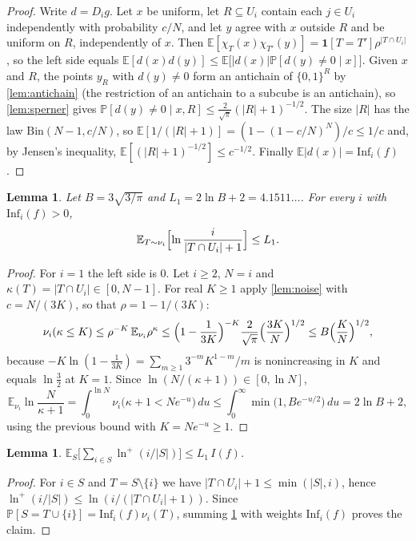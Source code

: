 \documentclass[11pt]{amsart}
\newtheorem{lemma}[theorem]{Lemma}
\theoremstyle{definition}
\theoremstyle{remark}
\newcommand{\E}{\mathbb{E}}
\renewcommand{\Pr}{\mathbb{P}}
\newcommand{\Inf}{\mathrm{Inf}}
\newcommand{\Bin}{\mathrm{Bin}}
\newcommand{\bits}{\{0,1\}}
\begin{document}
\begin{proof}
Write $d=D_ig$. Let $x$ be uniform, let $R\subseteq U_i$ contain each $j\in U_i$ independently with probability
$c/N$, and let $y$ agree with $x$ outside $R$ and be uniform on $R$, independently of $x$. Then
$\E[\chi_T(x)\chi_{T'}(y)]=\mathbf 1[T=T']\rho^{|T\cap U_i|}$, so the left side equals
$\E[d(x)d(y)]\le\E\bigl[|d(x)|\Pr[d(y)\ne0\mid x]\bigr]$. Given $x$ and $R$, the points $y_R$ with $d(y)\ne0$ form
an antichain of $\bits^R$ by \cref{lem:antichain} (the restriction of an antichain to a subcube is an antichain),
so \cref{lem:sperner} gives $\Pr[d(y)\ne0\mid x,R]\le\frac2{\sqrt\pi}(|R|+1)^{-1/2}$. The size $|R|$ has the law
$\Bin(N-1,c/N)$, so $\E[1/(|R|+1)]=(1-(1-c/N)^N)/c\le1/c$ and, by Jensen's inequality,
$\E[(|R|+1)^{-1/2}]\le c^{-1/2}$. Finally $\E|d(x)|=\Inf_i(f)$.
\end{proof}

\begin{lemma}\label{lem:ranktail}
Let $B=3\sqrt{3/\pi}$ and $L_1=2\ln B+2=4.1511\ldots$. For every $i$ with $\Inf_i(f)>0$,
\[
\E_{T\sim\nu_i}\Bigl[\ln\frac{i}{|T\cap U_i|+1}\Bigr]\le L_1 .
\]
\end{lemma}

\begin{proof}
For $i=1$ the left side is $0$. Let $i\ge2$, $N=i$ and $\kappa(T)=|T\cap U_i|\in[0,N-1]$. For real $K\ge1$ apply
\cref{lem:noise} with $c=N/(3K)$, so that $\rho=1-1/(3K)$:
\[
\nu_i(\kappa\le K)\le\rho^{-K}\,\E_{\nu_i}\rho^{\kappa}\le\Bigl(1-\frac1{3K}\Bigr)^{-K}\frac{2}{\sqrt\pi}
\Bigl(\frac{3K}N\Bigr)^{1/2}\le B\Bigl(\frac KN\Bigr)^{1/2},
\]
because $-K\ln(1-\frac1{3K})=\sum_{m\ge1}3^{-m}K^{1-m}/m$ is nonincreasing in $K$ and equals $\ln\frac32$ at $K=1$.
Since $\ln(N/(\kappa+1))\in[0,\ln N]$,
\[
\E_{\nu_i}\ln\frac N{\kappa+1}=\int_0^{\ln N}\nu_i\bigl(\kappa+1<Ne^{-u}\bigr)\,du
\le\int_0^\infty\min\bigl(1,Be^{-u/2}\bigr)\,du=2\ln B+2,
\]
using the previous bound with $K=Ne^{-u}\ge1$.
\end{proof}

\begin{lemma}\label{lem:ranksum}
$\E_S\bigl[\sum_{i\in S}\ln^+(i/|S|)\bigr]\le L_1\,I(f)$.
\end{lemma}

\begin{proof}
For $i\in S$ and $T=S\setminus\{i\}$ we have $|T\cap U_i|+1\le\min(|S|,i)$, hence
$\ln^+(i/|S|)\le\ln(i/(|T\cap U_i|+1))$. Since $\Pr[S=T\cup\{i\}]=\Inf_i(f)\nu_i(T)$, summing \cref{lem:ranktail}
with weights $\Inf_i(f)$ proves the claim.
\end{proof}
\end{document}
